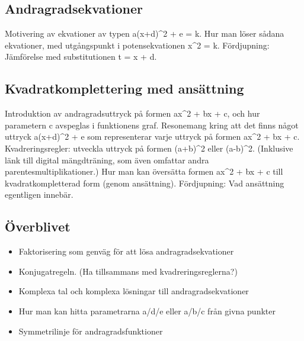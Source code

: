 \documentclass[12pt]{article}
\begin{document}
  \subsection{Andragradsekvationer}
  Motivering av ekvationer av typen a(x+d)^2 + e = k.
  Hur man löser sådana ekvationer, med utgångspunkt i potensekvationen x^2 = k.
  Fördjupning: Jämförelse med substitutionen t = x + d.

  \subsection{Kvadratkomplettering med ansättning}
  Introduktion av andragradsuttryck på formen ax^2 + bx + c, och hur parametern c avspeglas i funktionens graf.
  Resonemang kring att det finns något uttryck a(x+d)^2 + e som representerar varje uttryck på formen ax^2 + bx + c.
  Kvadreringsregler: utveckla uttryck på formen (a+b)^2 eller (a-b)^2.
  (Inklusive länk till digital mängdträning, som även omfattar andra parentesmultiplikationer.)
  Hur man kan översätta formen ax^2 + bx + c till kvadratkompletterad form (genom ansättning).
  Fördjupning: Vad ansättning egentligen innebär.
  
  \subsection{Överblivet}
  \begin{itemize}
    \item Faktorisering som genväg för att lösa andragradsekvationer
    \item Konjugatregeln. (Ha tillsammans med kvadreringsreglerna?)
    \item Komplexa tal och komplexa lösningar till andragradsekvationer
    \item Hur man kan hitta parametrarna a/d/e eller a/b/c från givna punkter
    \item Symmetrilinje för andragradsfunktioner
  \end{itemize}
\end{document}
